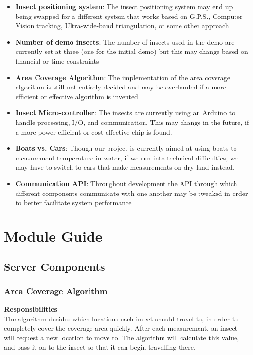 \documentclass[11pt]{article}
\begin{document}
\begin{itemize}
    \item \textbf{Insect positioning system}: The insect positioning system may end up being swapped for a different
    system that works based on G.P.S., Computer Vision tracking, Ultra-wide-band triangulation, or some other approach
    \item \textbf{Number of demo insects}: The number of insects used in the demo are currently set at three (one for
    the initial demo) but this may change based on financial or time constraints
    \item \textbf{Area Coverage Algorithm}: The implementation of the area coverage algorithm is still not entirely
    decided and may be overhauled if a more efficient or effective algorithm is invented
    \item \textbf{Insect Micro-controller}: The insects are currently using an Arduino to handle processing, I/O, and
    communication. This may change in the future, if a more power-efficient or cost-effective chip is found.
    \item \textbf{Boats vs. Cars}: Though our project is currently aimed at using boats to measurement temperature in
    water, if we run into technical difficulties, we may have to switch to cars that make measurements on dry land
    instead.
    \item \textbf{Communication API}: Throughout development the API through which different components communicate
    with one another may be tweaked in order to better facilitate system performance
\end{itemize}

\section{Module Guide}
\subsection{Server Components}
\subsubsection{Area Coverage Algorithm}
\textbf{Responsibilities} \\
The algorithm decides which locations each insect should travel to, in order to
completely cover the coverage area quickly. After each measurement, an insect will request
a new location to move to. The algorithm will calculate this value, and pass it on to the
insect so that it can begin travelling there. \\
\end{document}
